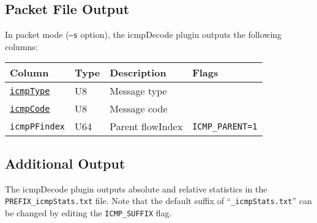\documentclass[documentation]{subfiles}
\begin{document}
\subsection{Packet File Output}
In packet mode ({\tt --s} option), the icmpDecode plugin outputs the following columns:
\begin{longtable}{llll}
    \toprule
    {\bf Column} & {\bf Type} & {\bf Description} & {\bf Flags}\\
    \midrule\endhead%
    {\tt \hyperref[icmpBFTypeCode]{icmpType}} & U8 & Message type\\
    {\tt \hyperref[icmpBFTypeCode]{icmpCode}} & U8 & Message code\\
    {\tt icmpPFindex} & U64 & Parent flowIndex & {\tt ICMP\_PARENT=1}\\
    \bottomrule
\end{longtable}

\subsection{Additional Output}\label{icmpDecode:additonalOutput}
The icmpDecode plugin outputs absolute and relative statistics in the {\tt PREFIX\_icmpStats.txt} file.
Note that the default suffix of ``{\tt \_icmpStats.txt}'' can be changed  by editing the {\tt ICMP\_SUFFIX} flag.\\
\end{document}
